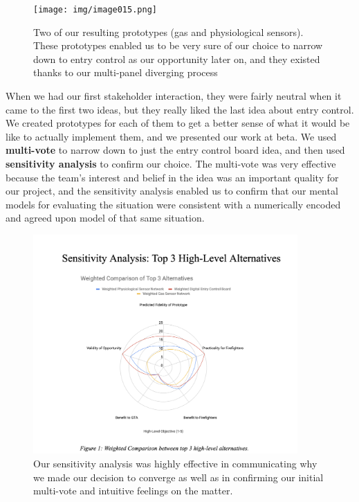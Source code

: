 \documentclass[a4paper,12pt]{article}
\begin{document}
\begin{figure}[H]
\centering
\texttt{[image: img/image015.png]}
\caption{Two of our resulting prototypes (gas and physiological sensors). These prototypes enabled us to be very sure of our choice to narrow down to entry control as our opportunity later on, and they existed thanks to our multi-panel diverging process}
\label{}
\end{figure}


When we had our first stakeholder interaction, they were fairly neutral when it came to the first two ideas, but they really liked the last idea about entry control. We created prototypes for each of them to get a better sense of what it would be like to actually implement them, and we presented our work at beta. We used \textbf{multi-vote} to narrow down to just the entry control board idea, and then used \textbf{sensitivity analysis} to confirm our choice. The multi-vote was very effective because the team’s interest and belief in the idea was an important quality for our project, and the sensitivity analysis enabled us to confirm that our mental models for evaluating the situation were consistent with a numerically encoded and agreed upon model of that same situation.

\begin{figure}[H]
\centering
\includegraphics[width=0.9\textwidth]{img/image016.png}
\caption{Our sensitivity analysis was highly effective in communicating why we made our decision to converge as well as in confirming our initial multi-vote and intuitive feelings on the matter.}
\label{}
\end{figure}
\end{document}
